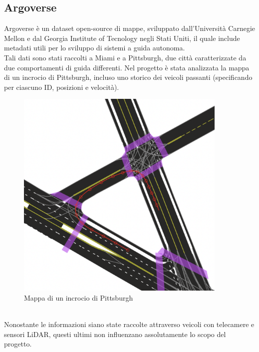 \documentclass[italian]{report}
\begin{document}
\subsection{Argoverse}
Argoverse è un dataset open-source di mappe, sviluppato dall'Università Carnegie Mellon e dal Georgia Institute of Tecnology negli Stati Uniti, il quale include metadati utili per lo sviluppo di sistemi a guida autonoma.\\
Tali dati sono stati raccolti a Miami e a Pittsburgh, due città caratterizzate da due comportamenti di guida differenti. Nel progetto è stata analizzata la mappa di un incrocio di Pittsburgh, incluso uno storico dei veicoli passanti (specificando per ciascuno ID, posizioni e velocità).\\
\begin{figure}[H]
	\centering
	\includegraphics[width=0.9\textwidth]{Pittsburgh}
	\footnotesize
	\caption{Mappa di un incrocio di Pittsburgh}
\end{figure}\\
Nonostante le informazioni siano state raccolte attraverso veicoli con telecamere e sensori LiDAR, questi ultimi non influenzano assolutamente lo scopo del progetto.
\end{document}
